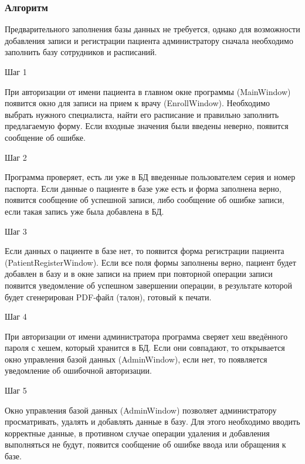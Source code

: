 \subsubsection{Алгоритм}

Предварительного заполнения базы данных не требуется, однако для возможности добавления записи и регистрации пациента администратору сначала необходимо заполнить базу сотрудников и расписаний.

\begin{center}
  Шаг 1
\end{center}

При авторизации от имени пациента в главном окне программы (MainWindow) появится окно для записи на прием к врачу (EnrollWindow). Необходимо выбрать нужного специалиста, найти его расписание и правильно заполнить предлагаемую форму. Если входные значения были введены неверно, появится сообщение об ошибке. 

\begin{center}
  Шаг 2
\end{center}

Программа проверяет, есть ли уже в БД введенные пользователем серия и номер паспорта. Если данные о пациенте в базе уже есть и форма заполнена верно, появится сообщение об успешной записи, либо сообщение об ошибке записи, если такая запись уже была добавлена в БД.

\begin{center}
  Шаг 3
\end{center}

Если данных о пациенте в базе нет, то появится форма регистрации пациента (PatientRegisterWindow). Если все поля формы заполнены верно, пациент будет добавлен в базу и в окне записи на прием при повторной операции записи появится уведомление об успешном завершении операции, в результате которой будет сгенерирован PDF-файл (талон), готовый к печати.

\begin{center}
  Шаг 4
\end{center}

При авторизации от имени администратора программа сверяет хеш введённого пароля с  хешем, который хранится в БД. Если они совпадают, то открывается окно управления базой данных (AdminWindow), если нет, то появляется уведомление об ошибочной авторизации.

\begin{center}
  Шаг 5
\end{center}

Окно управления базой данных (AdminWindow) позволяет администратору просматривать, удалять и добавлять данные в базу. Для этого необходимо вводить корректные данные, в противном случае операции удаления и добавления выполняться не будут, появится сообщение об ошибке ввода или обращения к базе.

